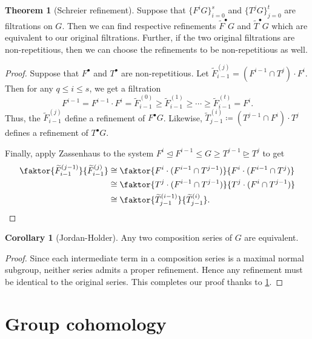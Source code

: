 \documentclass[10pt,letterpaper,cm]{nupset}
\theoremstyle{definition}
\theoremstyle{theorem}
\newtheorem{theorem}[definition]{Theorem}
\newtheorem{corollary}[definition]{Corollary}
\theoremstyle{remark}
\newcommand{\1}{\mathbf{1}}
\newcommand{\0}{\vec 0}
\begin{document}
\begin{theorem}[Schreier refinement]\label{schr}
Suppose that $\{F^iG\}_{i=0}^s$ and $\{T^jG\}_{j=0}^t$ are filtrations on $G$. Then we can find respective refinements $\widetilde{F}^{\bullet}G$ and $\widetilde{T}^{\bullet}G$ which are equivalent to our original filtrations. Further, if the two original filtrations are non-repetitious, then we can choose the refinements to be non-repetitious as well. 
\end{theorem}
\begin{proof}
Suppose that $F^{\bullet}$ and $T^{\bullet}$ are non-repetitious. Let $\widetilde{F}_{i-1}^{(j)} =  \left(F^{i-1}\cap T^j\right) \cdot F^i$. Then for any $q\leq i \leq s$, we get a filtration $$F^{i-1} = F^{i-1}\cdot F^i =\widetilde{F}_{i-1}^{(0)}\geq \widetilde{F}_{i-1}^{(1)}\geq \cdots \geq \widetilde{F}_{i-1}^{(t)} = F^i.$$ Thus, the $\widetilde{F}_{i-1}^{(j)}$ define a refinement of $F^{\bullet}G$. 
Likewise, $\widetilde{T}_{j-1}^{(i)} \coloneqq  (T^{j-1}\cap F^i) \cdot T^j$ defines a refinement of $T^{\bullet}G$.

\medskip

 Finally, apply Zassenhaus to the system $F^i \unlhd F^{i-1} \leq G \geq T^{j-1} \unrhd T^j$ to get
\begin{align*}
\faktor{\widetilde{F}_{i-1}^{(j-1)}}{\widetilde{F}_{i-1}^{(j)}} & \cong \faktor{F^i\cdot (F^{i-1} \cap T^{j-1})}{F^i \cdot (F^{i-1} \cap T^j)}
\\ &  \cong \faktor{T^j \cdot (F^{i-1} \cap T^{j-1})}{T^j\cdot (F^i \cap T^{j-1})}
\\ &  \cong   \faktor{\widetilde{T}_{j-1}^{(i-1)}}{\widetilde{T}_{j-1}^{(i)}} .
\end{align*}
\end{proof}

\begin{corollary}[Jordan-Holder]
Any two composition series of $G$ are equivalent.
\end{corollary}
\begin{proof}
Since each intermediate term in a composition series is a maximal normal subgroup, neither series admits a proper refinement. Hence any refinement must be identical to the original series. This completes our proof thanks to \cref{schr}.
\end{proof}

\section{Group cohomology}
\end{document}
